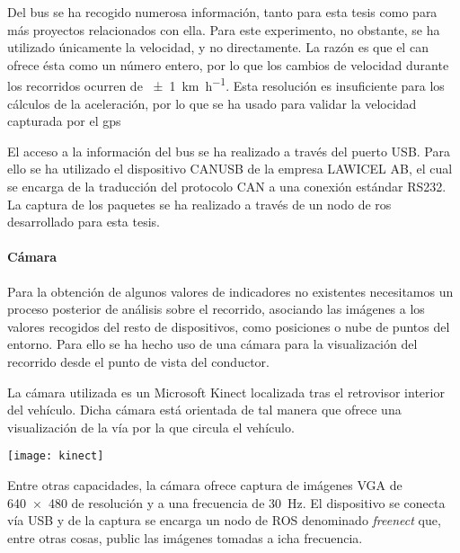 Del bus se ha recogido numerosa información, tanto para esta tesis como para más proyectos relacionados con ella. Para este experimento, no obstante, se ha utilizado únicamente la velocidad, y no directamente. La razón es que el \ac{can} ofrece ésta como un número entero, por lo que los cambios de velocidad durante los recorridos ocurren de \SI{\pm1}{\km\per\hour}. Esta resolución es insuficiente para los cálculos de la aceleración, por lo que se ha usado para validar la velocidad capturada por el \ac{gps}

El acceso a la información del bus se ha realizado a través del puerto USB. Para ello se ha utilizado el dispositivo CANUSB de la empresa LAWICEL AB, el cual se encarga de la traducción del protocolo CAN a una conexión estándar RS232. La captura de los paquetes se ha realizado a través de un nodo de \ac{ros} desarrollado para esta tesis.

\paragraph{Cámara}

Para la obtención de algunos valores de indicadores no existentes necesitamos un proceso posterior de análisis sobre el recorrido, asociando las imágenes a los valores recogidos del resto de dispositivos, como posiciones o nube de puntos del entorno. Para ello se ha hecho uso de una cámara para la visualización del recorrido desde el punto de vista del conductor.

La cámara utilizada es un Microsoft Kinect localizada tras el retrovisor interior del vehículo. Dicha cámara está orientada de tal manera que ofrece una visualización de la vía por la que circula el vehículo.

\begin{marginfigure}
	\centering
	\texttt{[image: kinect]}
	\caption[Cámara Microsoft Kinect]{La cámara Kinect desarrollada por Microsoft ofrece imágenes a color a una velocidad de \SI{30}{\fps} con una resolución de \SI{640x480}{\px}.}
	\label{fig:kinect}
\end{marginfigure}

Entre otras capacidades, la cámara ofrece captura de imágenes VGA de \SI{640x480}{\px} de resolución y a una frecuencia de \SI{30}{\Hz}. El dispositivo se conecta vía USB y de la captura se encarga un nodo de ROS denominado \textit{freenect} 	que, entre otras cosas, public las imágenes tomadas a icha frecuencia.

